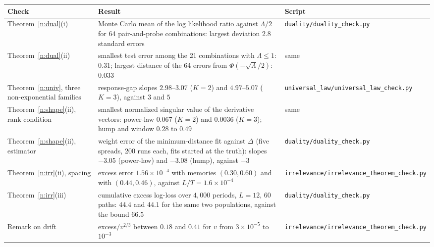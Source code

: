\begin{center}\small
\begin{tabular}{p{1.6in}p{2.9in}p{1.4in}}\toprule
Check & Result & Script \\\midrule
Theorem~\ref{n:dual}(i) & Monte Carlo mean of the log likelihood ratio against $\Lambda/2$ for 64 pair-and-probe combinations: largest deviation $2.8$ standard errors & \nolinkurl{duality/duality_check.py}\\
Theorem~\ref{n:dual}(ii) & smallest test error among the 21 combinations with $\Lambda\le1$: $0.31$; largest distance of the 64 errors from $\Phi(-\sqrt\Lambda/2)$: $0.033$ & same\\
Theorem~\ref{n:univ}, three non-exponential families & response-gap slopes $2.98$--$3.07$ ($K=2$) and $4.97$--$5.07$ ($K=3$), against $3$ and $5$ & \nolinkurl{universal_law/universal_law_check.py}\\
Theorem~\ref{n:shape}(ii), rank condition & smallest normalized singular value of the derivative vectors: power-law $0.067$ ($K=2$) and $0.0036$ ($K=3$); hump and window $0.28$ to $0.49$ & same\\
Theorem~\ref{n:shape}(ii), estimator & weight error of the minimum-distance fit against $\Delta$ (five spreads, 200 runs each, fits started at the truth): slopes $-3.05$ (power-law) and $-3.08$ (hump), against $-3$ & \nolinkurl{duality/duality_check.py}\\
Theorem~\ref{n:irr}(ii), spacing & excess error $1.56\times10^{-4}$ with memories $(0.30,0.60)$ and with $(0.44,0.46)$, against $L/T=1.6\times10^{-4}$ & \nolinkurl{irrelevance/irrelevance_theorem_check.py}\\
Theorem~\ref{n:irr}(iii) & cumulative excess log-loss over $4{,}000$ periods, $L=12$, 60 paths: $44.4$ and $44.1$ for the same two populations, against the bound $66.5$ & \nolinkurl{duality/duality_check.py}\\
Remark on drift & excess$/v^{2/3}$ between $0.18$ and $0.41$ for $v$ from $3\times10^{-5}$ to $10^{-3}$ & \nolinkurl{irrelevance/irrelevance_theorem_check.py}\\\bottomrule
\end{tabular}
\end{center}
